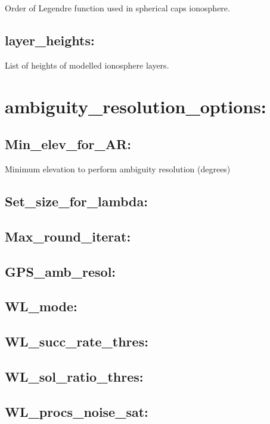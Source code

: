 Order of Legendre function used in spherical caps ionosphere.

\subsection*{layer\_heights:}

List of heights of modelled ionosphere layers.






\section{ambiguity\_resolution\_options:}

\subsection*{Min\_elev\_for\_AR:}

Minimum elevation to perform ambiguity resolution (degrees)

\subsection*{Set\_size\_for\_lambda:}

\subsection*{Max\_round\_iterat:}

\subsection*{GPS\_amb\_resol:}

\subsection*{WL\_mode:}

\subsection*{WL\_succ\_rate\_thres:}

\subsection*{WL\_sol\_ratio\_thres:}

\subsection*{WL\_procs\_noise\_sat:}

